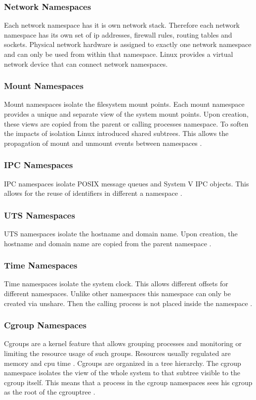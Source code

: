 \documentclass[10pt,twocolumn,a4paper]{article}
\begin{document}
\subsubsection{Network Namespaces}
Each network namespace has it is own network stack. Therefore each network namespace has its own set of ip
addresses, firewall rules, routing tables and sockets. Physical network hardware is assigned to exactly one
network namespace and can only be used from within that namespace. Linux provides a virtual network
device that can connect network namespaces\cite{10}.

\subsubsection{Mount Namespaces}
Mount namespaces isolate the filesystem mount points. 
Each mount namespace provides a unique and separate view of the system mount points. 
Upon creation, these views are copied from the parent or calling processes namespace.
To soften the impacts of isolation Linux introduced shared subtrees. This allows the propagation of
mount and unmount events between namespaces \cite{12}.

\subsubsection{IPC Namespaces}
IPC namespaces isolate POSIX message queues and System V IPC objects. This allows for the reuse of identifiers
in different a namespace \cite{13}.

\subsubsection{UTS Namespaces}
UTS namespaces isolate the hostname and domain name. Upon creation, the hostname and domain name
are copied from the parent namespace \cite{14}.

\subsubsection{Time Namespaces}
Time namespaces isolate the system clock. This allows different offsets for different namespaces.
Unlike other namespaces this namespace can only be created via unshare. 
Then the calling process is not placed inside the namespace \cite{15}.

\subsubsection{Cgroup Namespaces}
Cgroups are a kernel feature that allows grouping processes and monitoring or limiting the resource usage
of such groups.
Resources usually regulated are memory and cpu time \cite{16}.
Cgroups are organized in a tree hierarchy. 
The cgroup namespace isolates the view of the whole system to that subtree visible to the cgroup itself. 
This means that a process in the cgroup namespaces sees his cgroup as the root of the cgrouptree \cite{17}.
\end{document}
